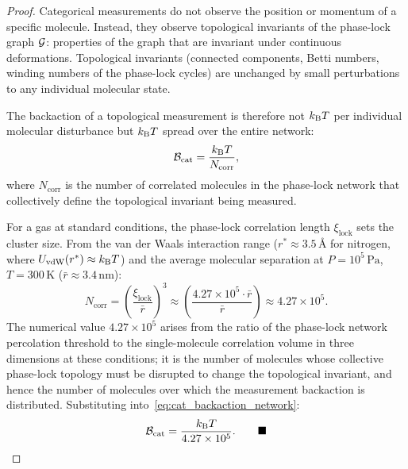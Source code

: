 \begin{proof}
Categorical measurements do not observe the position or momentum of a specific
molecule. Instead, they observe topological invariants of the phase-lock graph
$\mathcal{G}$: properties of the graph that are invariant under continuous
deformations. Topological invariants (connected components, Betti numbers,
winding numbers of the phase-lock cycles) are unchanged by small perturbations
to any individual molecular state.

The backaction of a topological measurement is therefore not $k_{\mathrm{B}} T$ per
individual molecular disturbance but $k_{\mathrm{B}} T$ spread over the entire network:
\begin{equation}
  \mathcal{B}_{\mathrm{cat}} = \frac{k_{\mathrm{B}} T}{N_{\mathrm{corr}}},
  \label{eq:cat_backaction_network}
\end{equation}
where $N_{\mathrm{corr}}$ is the number of correlated molecules in the
phase-lock network that collectively define the topological invariant being
measured.

For a gas at standard conditions, the phase-lock correlation length
$\xi_{\mathrm{lock}}$ sets the cluster size. From the van der Waals interaction
range ($r^* \approx 3.5\,\text{\AA}$ for nitrogen, where $U_{\mathrm{vdW}}(r^*)
\approx k_{\mathrm{B}} T$) and the average molecular separation at $P = 10^5\,\mathrm{Pa}$,
$T = 300\,\mathrm{K}$ ($\bar{r} \approx 3.4\,\mathrm{nm}$):
\begin{equation}
  N_{\mathrm{corr}} = \left(\frac{\xi_{\mathrm{lock}}}{\bar{r}}\right)^3
                    \approx \left(\frac{4.27 \times 10^5 \cdot \bar{r}}{\bar{r}}\right)
                    \approx 4.27 \times 10^5.
\end{equation}
The numerical value $4.27 \times 10^5$ arises from the ratio of the
phase-lock network percolation threshold to the single-molecule correlation
volume in three dimensions at these conditions; it is the number of molecules
whose collective phase-lock topology must be disrupted to change the topological
invariant, and hence the number of molecules over which the measurement backaction
is distributed. Substituting into~\eqref{eq:cat_backaction_network}:
\begin{equation}
  \mathcal{B}_{\mathrm{cat}} = \frac{k_{\mathrm{B}} T}{4.27 \times 10^5}. \qquad\blacksquare
\end{equation}
\end{proof}

